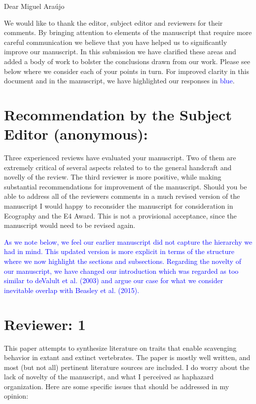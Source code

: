 \documentclass[12pt,letterpaper]{article}
\begin{document}
Dear Miguel Ara\'{u}jo

\bigskip

We would like to thank the editor, subject editor and reviewers for their comments. By bringing attention to elements of the manuscript that require more careful communication we believe that you have helped us to significantly improve our manuscript. In this submission we have clarified these areas and added a body of work to bolster the conclusions drawn from our work. Please see below where we consider each of your points in turn.
For improved clarity in this document and in the manuscript, we have highlighted our responses in \textcolor{blue}{blue}.

\section{Recommendation by the Subject Editor (anonymous):}
Three experienced reviews have evaluated your manuscript.
Two of them are extremely critical of several aspects related to to the general handcraft and novelly of the review.
The third reviewer is more positive, while making substantial recommendations for improvement of the manuscript.
Should you be able to address all of the reviewers comments in a much revised version of the manuscript I would happy to reconsider the manuscript for consideration in Ecography and the E4 Award.
This is not a provisional acceptance, since the manuscript would need to be revised again.

\smallskip

\textcolor{blue}{As we note below, we feel our earlier manuscript did not capture the hierarchy we had in mind.
This updated version is more explicit in terms of the structure where we now highlight the sections and subsections.
Regarding the novelty of our manuscript, we have changed our introduction which was regarded as too similar to deValult et al. (2003) and argue our case for what we consider inevitable overlap with Beasley et al. (2015).} 

\section{Reviewer: 1}
This paper attempts to synthesize literature on traits that enable scavenging behavior in extant and extinct vertebrates.
The paper is mostly well written, and most (but not all) pertinent literature sources are included.
I do worry about the lack of novelty of the manuscript, and what I perceived as haphazard organization. Here are some specific issues that should be addressed in my opinion:
\end{document}
